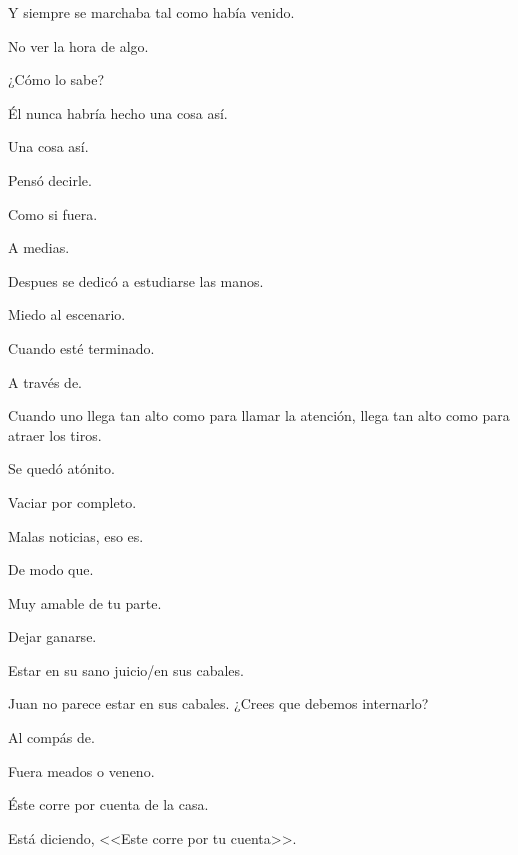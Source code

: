 \sk
Y siempre se marchaba tal como había venido. 

\sk
No ver la hora de algo. 

\sk
¿Cómo lo sabe? 

\sk
Él nunca habría hecho una cosa así.  

\sk
Una cosa así. 

\sk
Pensó decirle. 

\sk
Como si fuera. 

\sk
A medias. 

\sk
Despues se dedicó a estudiarse las manos. 

\sk
Miedo al escenario. 

\sk
Cuando esté terminado. 

\sk
A través de. 

\sk
Cuando uno llega tan alto como para llamar la atención, llega tan alto como para atraer los tiros. 

\sk
Se quedó atónito. 

\sk
Vaciar por completo. 

\sk
Malas noticias, eso es. 

\sk
De modo que. 

\sk
Muy amable de tu parte. 

\sk
Dejar ganarse. 

\sk
Estar en su sano juicio/en sus cabales. 

\sk
Juan no parece estar en sus cabales. ¿Crees que debemos internarlo? 

\sk
Al compás de. 

\sk
Fuera meados o veneno. 

\sk
Éste corre por cuenta de la casa. 

\sk
Está diciendo, <<Este corre por tu cuenta>>. 

